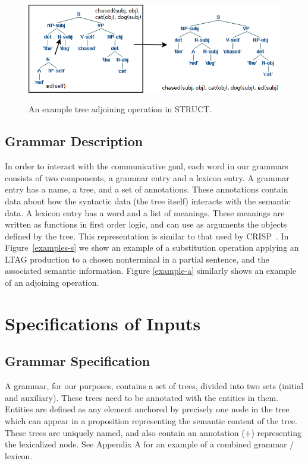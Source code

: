 \begin{figure}[t]
\centering
\includegraphics[width= 0.7 \linewidth]{adjoin-example.png}\label{examples-a}
\caption{An example tree adjoining operation in STRUCT.}
\end{figure}

\subsection{Grammar Description}
 In order to interact with the communicative goal, each word in our
 grammars consists of two components, a grammar entry and a lexicon
 entry.  A grammar entry has a name, a tree, and a set of annotations.
 These annotations contain data about how the syntactic data (the tree
 itself) interacts with the semantic data.  A lexicon entry has a word
 and a list of meanings.  These meanings are written as functions in
 first order logic, and can use as arguments the objects defined by
 the tree. This representation is similar to that used by
 CRISP~\cite{koller_sentence_2007}. In Figure~\ref{examples-s}
  we show an example of a substitution operation applying an LTAG production to
 a chosen nonterminal in a partial sentence, and the associated
 semantic information.  Figure \ref{example-a} similarly shows an example
 of an adjoining operation.

\section{Specifications of Inputs}

\subsection{Grammar Specification}

A grammar, for our purposes, contains a set of trees, divided into two sets (initial and auxiliary).
These trees need to be annotated with the entities in them.  Entities are defined as any element
anchored by precisely one node in the tree which can appear in a proposition representing the
semantic content of the tree.  These trees are uniquely named, and also contain an
annotation (+) representing the lexicalized node.  See Appendix A for an example of a combined
grammar / lexicon.

